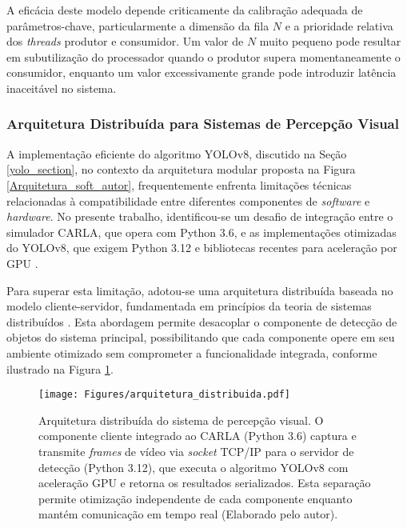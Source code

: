 A eficácia deste modelo depende criticamente da calibração adequada de parâmetros-chave, particularmente a dimensão da fila $N$ e a prioridade relativa dos \textit{threads} produtor e consumidor. Um valor de $N$ muito pequeno pode resultar em subutilização do processador quando o produtor supera momentaneamente o consumidor, enquanto um valor excessivamente grande pode introduzir latência inaceitável no sistema. 

\subsubsection{Arquitetura Distribuída para Sistemas de Percepção Visual} \label{subsubsec:arquitetura_distribuida}

A implementação eficiente do algoritmo YOLOv8, discutido na Seção \ref{yolo_section}, no contexto da arquitetura modular proposta na Figura \ref{Arquitetura_soft_autor}, frequentemente enfrenta limitações técnicas relacionadas à compatibilidade entre diferentes componentes de \textit{software} e \textit{hardware}. No presente trabalho, identificou-se um desafio de integração entre o simulador CARLA, que opera com Python 3.6, e as implementações otimizadas do YOLOv8, que exigem Python 3.12 e bibliotecas recentes para aceleração por GPU \cite{wang2024yolov10realtimeendtoendobject}.

Para superar esta limitação, adotou-se uma arquitetura distribuída baseada no modelo cliente-servidor, fundamentada em princípios da teoria de sistemas distribuídos \cite{iordache2021smart}. Esta abordagem permite desacoplar o componente de detecção de objetos do sistema principal, possibilitando que cada componente opere em seu ambiente otimizado sem comprometer a funcionalidade integrada, conforme ilustrado na Figura \ref{fig:distributed_architecture}.

\begin{figure}[H]
\centering
\texttt{[image: Figures/arquitetura\_distribuida.pdf]}
\caption{Arquitetura distribuída do sistema de percepção visual. O componente cliente integrado ao CARLA (Python 3.6) captura e transmite \textit{frames} de vídeo via \textit{socket} TCP/IP para o servidor de detecção (Python 3.12), que executa o algoritmo YOLOv8 com aceleração GPU e retorna os resultados serializados. Esta separação permite otimização independente de cada componente enquanto mantém comunicação em tempo real (Elaborado pelo autor).}
\label{fig:distributed_architecture}
\end{figure}

